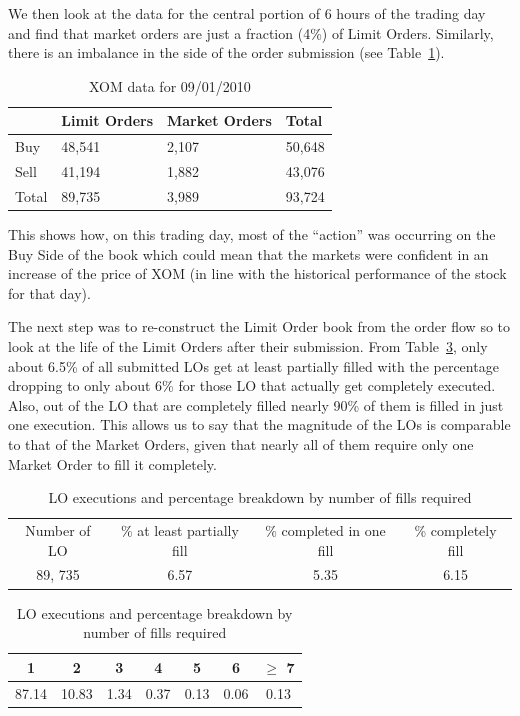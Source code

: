 We then look at the data for the central portion of 6 hours of the trading day and find that market orders are just a fraction (4\%) of Limit Orders. Similarly, there is an imbalance in the side of the order submission (see Table~\ref{tab:xom}). 
	\begin{table}[!ht]
	\centering
	\caption{XOM data for 09/01/2010 \label{tab:xom}}
	\begin{tabular}{llll} 
	& Limit Orders & Market Orders & Total \\ \hline
	Buy & 48,541 & 2,107 & 50,648 \\ 
	Sell & 41,194 & 1,882 & 43,076 \\
	Total & 89,735 & 3,989 & 93,724
	\end{tabular}
	\end{table}
This shows how, on this trading day, most of the ``action'' was occurring on the Buy Side of the book which could mean that the markets were confident in an increase of the price of XOM (in line with the historical performance of the stock for that day).


The next step was to re-construct the Limit Order book from the order flow so to look at the life of the Limit Orders after their submission. From Table~\ref{tab:LOexec}, only about 6.5\% of all submitted LOs get at least partially filled with the percentage dropping to only about 6\% for those LO that actually get completely executed. Also, out of the LO that are completely filled nearly 90\% of them is filled in just one execution. This allows us to say that the magnitude of the LOs is comparable to that of the Market Orders, given that nearly all of them require only one Market Order to fill it completely. 
	\begin{table}[!ht]
	\centering
	\caption{LO executions and percentage breakdown by number of fills required \label{tab:LOexec}}
	\begin{tabular}{cccc}
	Number of LO & \% at least partially fill & \% completed in one fill & \% completely fill \\
	89, 735 & 6.57 & 5.35 & 6.15
	\end{tabular}
	\begin{tabular}{ccccccc}
	1 & 2 & 3 & 4 & 5 & 6 & $\geq$ 7 \\ \hline
	87.14 & 10.83 & 1.34 & 0.37 & 0.13 & 0.06 & 0.13
	\end{tabular}
	\end{table}



